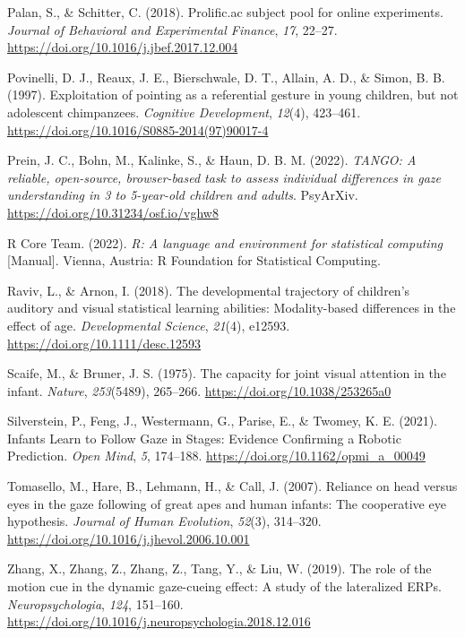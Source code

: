\documentclass[
  man,floatsintext]{apa6}
\newlength{\cslhangindent}
\newlength{\cslentryspacingunit} %
\newenvironment{CSLReferences}[2] %
 {%
  \setlength{\parindent}{0pt}
  \ifodd #1
  \let\oldpar\par
  \def\par{\hangindent=\cslhangindent\oldpar}
  \fi
  \setlength{\parskip}{#2\cslentryspacingunit}
 }%
 {}
\begin{document}
\begin{CSLReferences}{1}{0}
\leavevmode{}%
Palan, S., \& Schitter, C. (2018). Prolific.ac subject pool for online experiments. \emph{Journal of Behavioral and Experimental Finance}, \emph{17}, 22--27. \url{https://doi.org/10.1016/j.jbef.2017.12.004}

\leavevmode{}%
Povinelli, D. J., Reaux, J. E., Bierschwale, D. T., Allain, A. D., \& Simon, B. B. (1997). Exploitation of pointing as a referential gesture in young children, but not adolescent chimpanzees. \emph{Cognitive Development}, \emph{12}(4), 423--461. \url{https://doi.org/10.1016/S0885-2014(97)90017-4}

\leavevmode{}%
Prein, J. C., Bohn, M., Kalinke, S., \& Haun, D. B. M. (2022). \emph{{TANGO}: {A} reliable, open-source, browser-based task to assess individual differences in gaze understanding in 3 to 5-year-old children and adults}. {PsyArXiv}. \url{https://doi.org/10.31234/osf.io/vghw8}

\leavevmode{}%
R Core Team. (2022). \emph{R: {A} language and environment for statistical computing} {[}Manual{]}. {Vienna, Austria}: {R Foundation for Statistical Computing}.

\leavevmode{}%
Raviv, L., \& Arnon, I. (2018). The developmental trajectory of children's auditory and visual statistical learning abilities: Modality-based differences in the effect of age. \emph{Developmental Science}, \emph{21}(4), e12593. \url{https://doi.org/10.1111/desc.12593}

\leavevmode{}%
Scaife, M., \& Bruner, J. S. (1975). The capacity for joint visual attention in the infant. \emph{Nature}, \emph{253}(5489), 265--266. \url{https://doi.org/10.1038/253265a0}

\leavevmode{}%
Silverstein, P., Feng, J., Westermann, G., Parise, E., \& Twomey, K. E. (2021). Infants {Learn} to {Follow Gaze} in {Stages}: {Evidence Confirming} a {Robotic Prediction}. \emph{Open Mind}, \emph{5}, 174--188. \url{https://doi.org/10.1162/opmi_a_00049}

\leavevmode{}%
Tomasello, M., Hare, B., Lehmann, H., \& Call, J. (2007). Reliance on head versus eyes in the gaze following of great apes and human infants: The cooperative eye hypothesis. \emph{Journal of Human Evolution}, \emph{52}(3), 314--320. \url{https://doi.org/10.1016/j.jhevol.2006.10.001}

\leavevmode{}%
Zhang, X., Zhang, Z., Zhang, Z., Tang, Y., \& Liu, W. (2019). The role of the motion cue in the dynamic gaze-cueing effect: {A} study of the lateralized {ERPs}. \emph{Neuropsychologia}, \emph{124}, 151--160. \url{https://doi.org/10.1016/j.neuropsychologia.2018.12.016}

\end{CSLReferences}

\endgroup

\newpage
\end{document}
